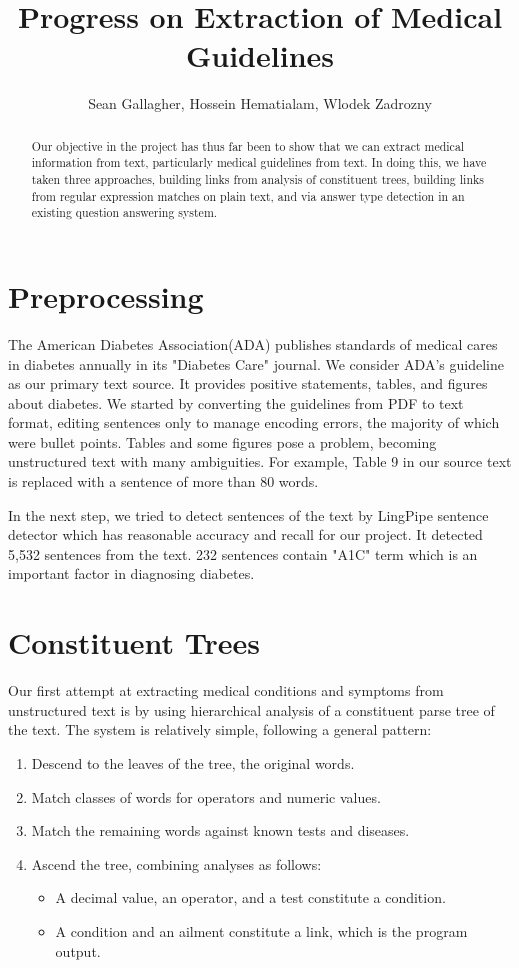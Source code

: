\documentclass[12pt,letterpaper]{article}
\author{Sean Gallagher, Hossein Hematialam, Wlodek Zadrozny}
\title{Progress on Extraction of Medical Guidelines}
\begin{document}
\maketitle
\begin{abstract}
Our objective in the project has thus far been to show that we can extract medical information from text, particularly medical guidelines from text. In doing this, we have taken three approaches, building links from analysis of constituent trees, building links from regular expression matches on plain text, and via answer type detection in an existing question answering system.
\end{abstract}

\section{Preprocessing}
The American Diabetes Association(ADA) publishes standards of medical cares in diabetes annually in its "Diabetes Care" journal. We consider ADA's guideline as our primary text source. It provides positive statements, tables, and figures about diabetes. We started by converting the guidelines from PDF to text format, editing sentences only to manage encoding errors, the majority of which were bullet points. Tables and some figures pose a problem, becoming unstructured text with many ambiguities. For example, Table 9 in our source text is replaced with a sentence of more than 80 words.

In the next step, we tried to detect sentences of the text by LingPipe sentence detector which has reasonable accuracy and recall for our project. It detected 5,532 sentences from the text. 232 sentences contain "A1C" term which is an important factor in diagnosing diabetes.
   
\section{Constituent Trees}
Our first attempt at extracting medical conditions and symptoms from unstructured text is by using hierarchical analysis of a constituent parse tree of the text. The system is relatively simple, following a general pattern:

\begin{enumerate}
\item Descend to the leaves of the tree, the original words.
\item Match classes of words for operators and numeric values.
\item Match the remaining words against known tests and diseases.
\item Ascend the tree, combining analyses as follows:
\begin{itemize}
	\item A decimal value, an operator, and a test constitute a condition.
	\item A condition and an ailment constitute a link, which is the program output.
\end{itemize}
\end{enumerate}
\end{document}
